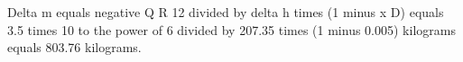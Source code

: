 Delta m equals negative Q R 12 divided by delta h times (1 minus x D) equals 3.5 times 10 to the power of 6 divided by 207.35 times (1 minus 0.005) kilograms equals 803.76 kilograms.